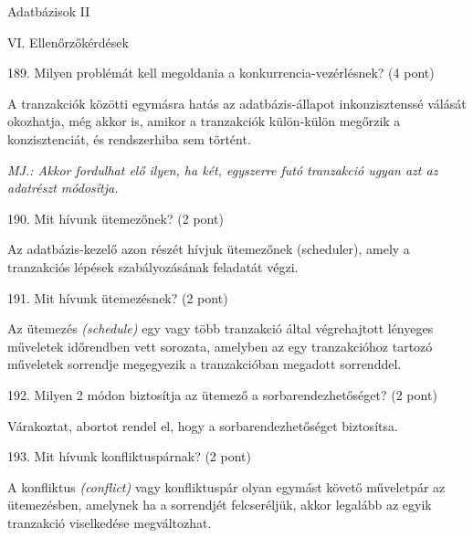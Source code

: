 \documentclass[a4paper,11.5pt, table]{article}
\begin{document}
	\begin{center}
		{\Huge Adatbázisok II}
		\smallskip
		
		{\Large VI. Ellenőrzőkérdések}
	\end{center}
189. Milyen problémát kell megoldania a konkurrencia-vezérlésnek? (4 pont)
	\begin{compactitem}
		\item A tranzakciók közötti egymásra hatás az adatbázis-állapot inkonzisztenssé válását okozhatja, még akkor is, amikor a tranzakciók külön-külön megőrzik a konzisztenciát, és rendszerhiba sem történt. 
		\item \textit{MJ.: Akkor fordulhat elő ilyen, ha két, egyszerre futó tranzakció ugyan azt az adatrészt módosítja.}
	\end{compactitem}

190. Mit hívunk ütemezőnek? (2 pont)
	\begin{compactitem}
		\item Az adatbázis-kezelő azon részét hívjuk ütemezőnek (scheduler), amely a tranzakciós lépések szabályozásának feladatát végzi.
	\end{compactitem}

191. Mit hívunk ütemezésnek? (2 pont)
	\begin{compactitem}
		\item Az ütemezés \textit{(schedule)} egy vagy több tranzakció által végrehajtott lényeges műveletek időrendben vett sorozata, amelyben az egy tranzakcióhoz tartozó műveletek sorrendje megegyezik a tranzakcióban megadott sorrenddel. 
	\end{compactitem}

192. Milyen 2 módon biztosítja az ütemező a sorbarendezhetőséget? (2 pont)
	\begin{compactitem}
		\item Várakoztat, abortot rendel el, hogy a sorbarendezhetőséget biztosítsa.
	\end{compactitem}

193. Mit hívunk konfliktuspárnak? (2 pont)
	\begin{compactitem}
		\item A konfliktus \textit{(conflict)} vagy konfliktuspár olyan egymást követő műveletpár az ütemezésben, amelynek ha a sorrendjét felcseréljük, akkor legalább az egyik tranzakció viselkedése megváltozhat.
	\end{compactitem}
\end{document}
